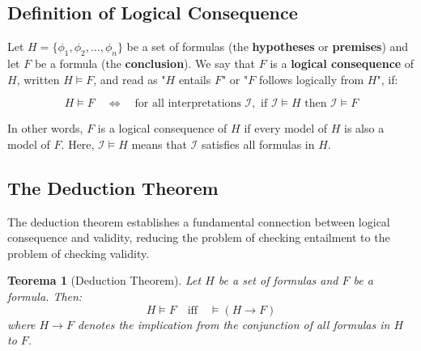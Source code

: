 \documentclass[11pt,a4paper]{article}
\theoremstyle{definition}
\theoremstyle{plain}
\newtheorem{theorem}{Teorema}[section]
\theoremstyle{remark}
\begin{document}
\subsection{Definition of Logical Consequence}

Let $H = \{\phi_1, \phi_2, \dots, \phi_n\}$ be a set of formulas (the \textbf{hypotheses} or \textbf{premises}) and let $F$ be a formula (the \textbf{conclusion}). We say that $F$ is a \textbf{logical consequence} of $H$, written $H \models F$, and read as "$H$ entails $F$" or "$F$ follows logically from $H$", if:

\[
H \models F \quad \Leftrightarrow \quad \text{for all interpretations } \mathcal{I}, \text{ if } \mathcal{I} \models H \text{ then } \mathcal{I} \models F
\]

In other words, $F$ is a logical consequence of $H$ if every model of $H$ is also a model of $F$. Here, $\mathcal{I} \models H$ means that $\mathcal{I}$ satisfies all formulas in $H$.

\subsection{The Deduction Theorem}

The deduction theorem establishes a fundamental connection between logical consequence and validity, reducing the problem of checking entailment to the problem of checking validity.

\begin{theorem}[Deduction Theorem]
Let $H$ be a set of formulas and $F$ be a formula. Then:
\[
H \models F \quad \text{iff} \quad \models (H \rightarrow F)
\]
where $H \rightarrow F$ denotes the implication from the conjunction of all formulas in $H$ to $F$.
\end{theorem}
\end{document}
